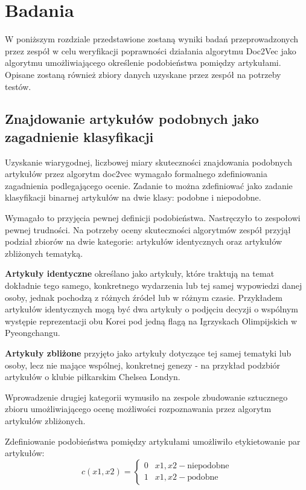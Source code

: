 \section{Badania}

W poniższym rozdziale przedstawione zostaną wyniki badań przeprowadzonych przez zespół w celu weryfikacji poprawności działania algorytmu Doc2Vec jako algorytmu umożliwiającego określenie podobieństwa pomiędzy artykułami. Opisane zostaną również zbiory danych uzyskane przez zespół na potrzeby testów.

\subsection{Znajdowanie artykułów podobnych jako zagadnienie klasyfikacji}

\par Uzyskanie wiarygodnej, liczbowej miary skuteczności znajdowania podobnych artykułów przez algorytm doc2vec wymagało formalnego zdefiniowania zagadnienia podlegającego ocenie. Zadanie to można zdefiniować jako zadanie klasyfikacji binarnej artykułów na dwie klasy: podobne i niepodobne.
\par Wymagało to przyjęcia pewnej definicji podobieństwa. Nastręczyło to zespołowi pewnej trudności. Na potrzeby oceny skuteczności algorytmów zespół przyjął podział zbiorów na dwie kategorie: artykułów identycznych oraz artykułów zbliżonych tematyką.
\par \textbf{Artykuły identyczne} określano jako artykuły, które traktują na temat dokładnie tego samego, konkretnego wydarzenia lub tej samej wypowiedzi danej osoby, jednak pochodzą z różnych źródeł lub w różnym czasie. Przykładem artykułów identycznych mogą być dwa artykuły o podjęciu decyzji o wspólnym występie reprezentacji obu Korei pod jedną flagą na Igrzyskach Olimpijskich w Pyeongchangu.
\par \textbf{Artykuły zbliżone} przyjęto jako artykuły dotyczące tej samej tematyki lub osoby, lecz nie mające wspólnej, konkretnej genezy - na przykład podzbiór artykułów o klubie piłkarskim Chelsea Londyn.
\par Wprowadzenie drugiej kategorii wymusiło na zespole zbudowanie sztucznego zbioru umożliwiającego ocenę możliwości rozpoznawania przez algorytm artykułów zbliżonych.
\par Zdefiniowanie podobieństwa pomiędzy artykułami umożliwiło etykietowanie par artykułów:
 \[c(x1, x2) = \begin{cases}
			0 & {x1, x2} - \text{niepodobne} \\
			1 & {x1, x2} - \text{podobne}
			\end{cases}
		\]
		
